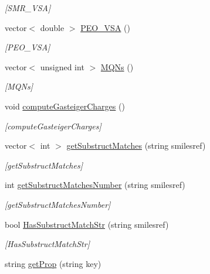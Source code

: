 \begin{DoxyCompactItemize}
\begin{DoxyCompactList}\small\item\em \mbox{[}S\+M\+R\+\_\+\+V\+SA\mbox{]} \end{DoxyCompactList}\item 
vector$<$ double $>$ \mbox{\hyperlink{class_molecule_a7af6b3bc2840250b9e9aac63067a4b3d}{P\+E\+O\+\_\+\+V\+SA}} ()
\begin{DoxyCompactList}\small\item\em \mbox{[}P\+E\+O\+\_\+\+V\+SA\mbox{]} \end{DoxyCompactList}\item 
vector$<$ unsigned int $>$ \mbox{\hyperlink{class_molecule_a982b663705ea294980bdb56458dc9bd1}{M\+Q\+Ns}} ()
\begin{DoxyCompactList}\small\item\em \mbox{[}M\+Q\+Ns\mbox{]} \end{DoxyCompactList}\item 
void \mbox{\hyperlink{class_molecule_ad5c41d17dd1d3b564f85f97620cc508b}{compute\+Gasteiger\+Charges}} ()
\begin{DoxyCompactList}\small\item\em \mbox{[}compute\+Gasteiger\+Charges\mbox{]} \end{DoxyCompactList}\item 
vector$<$ int $>$ \mbox{\hyperlink{class_molecule_a5d33d9bf92166de9e58d6deadddc9fed}{get\+Substruct\+Matches}} (string smilesref)
\begin{DoxyCompactList}\small\item\em \mbox{[}get\+Substruct\+Matches\mbox{]} \end{DoxyCompactList}\item 
int \mbox{\hyperlink{class_molecule_a07e55f82e97dfe4c49855b5bb81c49d2}{get\+Substruct\+Matches\+Number}} (string smilesref)
\begin{DoxyCompactList}\small\item\em \mbox{[}get\+Substruct\+Matches\+Number\mbox{]} \end{DoxyCompactList}\item 
bool \mbox{\hyperlink{class_molecule_a5494377b1f6db28c894941c0139496b3}{Has\+Substruct\+Match\+Str}} (string smilesref)
\begin{DoxyCompactList}\small\item\em \mbox{[}Has\+Substruct\+Match\+Str\mbox{]} \end{DoxyCompactList}\item 
string \mbox{\hyperlink{class_molecule_ad465fbdb8c43e8280e4dcf3eefac1e13}{get\+Prop}} (string key)

\end{DoxyCompactItemize}
